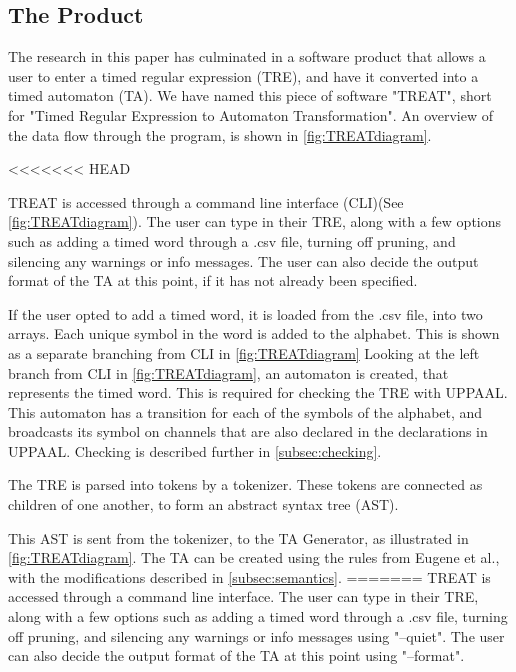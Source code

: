 \subsection{The Product}\label{subsec:theProduct}
The research in this paper has culminated in a software product that allows a user to enter a timed regular expression (TRE), and have it converted into a timed automaton (TA).
We have named this piece of software "TREAT", short for "Timed Regular Expression to Automaton Transformation".
An overview of the data flow through the program, is shown in \cref{fig:TREATdiagram}.

<<<<<<< HEAD


TREAT is accessed through a command line interface (CLI)(See \cref{fig:TREATdiagram}). The user can type in their TRE, along with a few options such as adding a timed word through a .csv file, turning off pruning, and silencing any warnings or info messages.
The user can also decide the output format of the TA at this point, if it has not already been specified. 

If the user opted to add a timed word, it is loaded from the .csv file, into two arrays. Each unique symbol in the word is added to the alphabet. This is shown as a separate branching from CLI in \cref*{fig:TREATdiagram}
Looking at the left branch from CLI in \cref*{fig:TREATdiagram}, an automaton is created, that represents the timed word. 
This is required for checking the TRE with UPPAAL. 
This automaton has a transition for each of the symbols of the alphabet, and broadcasts its symbol on channels that are also declared in the declarations in UPPAAL. 
Checking is described further in \cref{subsec:checking}.

The TRE is parsed into tokens by a tokenizer. These tokens are connected as children of one another, to form an abstract syntax tree (AST). 

This AST is sent from the tokenizer, to the TA Generator, as illustrated in \cref*{fig:TREATdiagram}. The TA can be created using the rules from Eugene et al., with the modifications described in \cref{subsec:semantics}.
=======
TREAT is accessed through a command line interface. The user can type in their TRE, along with a few options such as adding a timed word through a .csv file, turning off pruning, and silencing any warnings or info messages using "--quiet".
The user can also decide the output format of the TA at this point using "--format".

